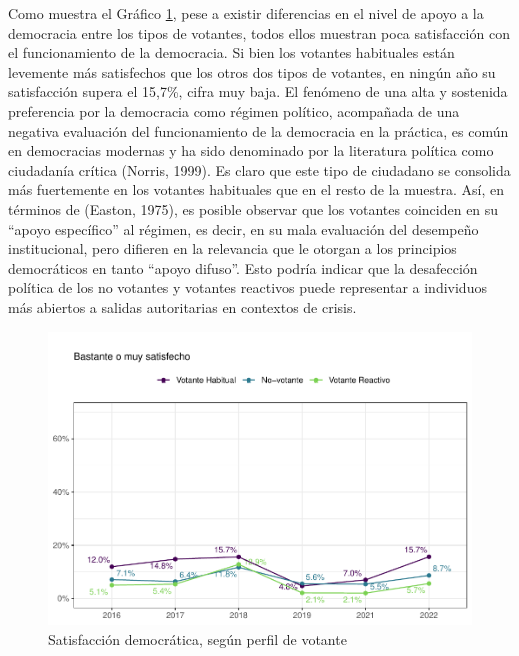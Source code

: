 \documentclass[
  12pt,
]{book}
\begin{document}
Como muestra el Gráfico \ref{fig:graf-satis-dem-2}, pese a existir diferencias en el nivel de apoyo a la democracia entre los tipos de votantes, todos ellos muestran poca satisfacción con el funcionamiento de la democracia. Si bien los votantes habituales están levemente más satisfechos que los otros dos tipos de votantes, en ningún año su satisfacción supera el 15,7\%, cifra muy baja. El fenómeno de una alta y sostenida preferencia por la democracia como régimen político, acompañada de una negativa evaluación del funcionamiento de la democracia en la práctica, es común en democracias modernas y ha sido denominado por la literatura política como ciudadanía crítica (Norris, 1999). Es claro que este tipo de ciudadano se consolida más fuertemente en los votantes habituales que en el resto de la muestra. Así, en términos de (Easton, 1975), es posible observar que los votantes coinciden en su ``apoyo específico'' al régimen, es decir, en su mala evaluación del desempeño institucional, pero difieren en la relevancia que le otorgan a los principios democráticos en tanto ``apoyo difuso''. Esto podría indicar que la desafección política de los no votantes y votantes reactivos puede representar a individuos más abiertos a salidas autoritarias en contextos de crisis.

\begin{figure}

{\centering \includegraphics{reporte-elsoc_files/figure-latex/graf-satis-dem-2-1} 

}

\caption{Satisfacción democrática, según perfil de votante}\label{fig:graf-satis-dem-2}
\end{figure}
\end{document}
